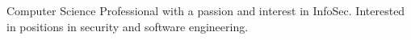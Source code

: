 

\begin{cvparagraph}

Computer Science Professional with a passion and interest in InfoSec. Interested in positions in security and software engineering.

\end{cvparagraph}
